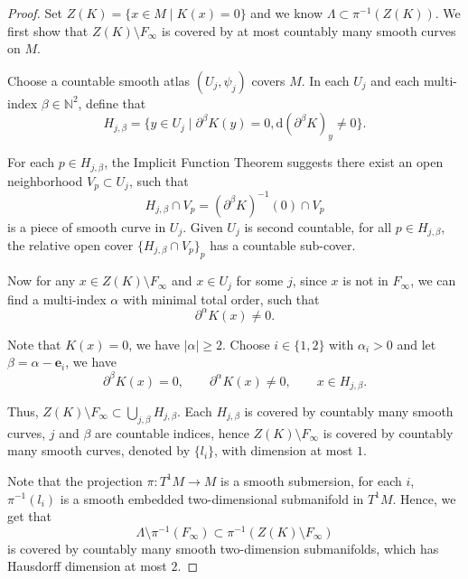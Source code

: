 \documentclass[reqno,11pt]{article}
\theoremstyle{definition}
\theoremstyle{remark}
\numberwithin{equation}{section}
\begin{document}
\begin{proof}
	Set $Z(K)=\{x\in M\mid K(x)=0\}$ and we know $\Lambda\subset\pi^{-1}(Z(K))$. We first show that $Z(K)\setminus F_{\infty}$ is covered by at most countably many smooth curves on $M$.

	Choose a countable smooth atlas $(U_{j},\psi_{j})$ covers $M$. In each $U_{j}$ and each multi-index $\beta\in\mathbb{N}^{2}$, define that
	\begin{displaymath}
		H_{j,\beta}=\{y\in U_{j}\mid \partial^{\beta}K(y)=0, {\mathrm{d}(\partial^{\beta}K)}_{y}\neq 0\}.
	\end{displaymath}

	For each $p\in H_{j,\beta}$, the Implicit Function Theorem suggests there exist an open neighborhood $V_{p}\subset U_{j}$, such that
	\begin{displaymath}
		H_{j,\beta}\cap V_{p}={(\partial^{\beta}K)}^{-1}(0)\cap V_{p}
	\end{displaymath}
	is a piece of smooth curve in $U_j$. Given $U_{j}$ is second countable, for all $p\in H_{j,\beta}$, the relative open cover ${\{H_{j,\beta}\cap V_{p}\}}_{p}$ has a countable sub-cover.

	Now for any $x\in Z(K)\setminus F_{\infty}$ and $x\in U_{j}$ for some $j$, since $x$ is not in $F_{\infty}$, we can find a multi-index $\alpha$ with minimal total order, such that
	\begin{displaymath}
		\partial^{\alpha} K(x)\neq 0.
	\end{displaymath}

	Note that $K(x)=0$, we have $|\alpha|\ge 2$. Choose $i\in\{1,2\}$ with $\alpha_{i}>0$ and let $\beta=\alpha-\bm{e}_{i}$, we have
	\begin{displaymath}
		\partial^{\beta} K(x)=0,\qquad \partial^{\alpha} K(x)\neq 0,\qquad x\in H_{j,\beta}.
	\end{displaymath}

	Thus, $Z(K)\setminus F_{\infty}\subset \bigcup_{j,\beta} H_{j,\beta}$. Each $H_{j,\beta}$ is covered by countably many smooth curves, $j$ and $\beta$ are countable indices, hence $Z(K)\setminus F_{\infty}$ is covered by countably many smooth curves, denoted by $\{l_{i}\}$, with dimension at most $1$.

	Note that the projection $\pi: T^{1}M\to M$ is a smooth submersion, for each $i$, $\pi^{-1}(l_{i})$ is a smooth embedded two-dimensional submanifold in $T^{1}M$. Hence, we get that
	\begin{displaymath}
		\Lambda\setminus\pi^{-1}(F_{\infty})\subset \pi^{-1}(Z(K)\setminus F_{\infty})
	\end{displaymath}
	is covered by countably many smooth two-dimension submanifolds, which has Hausdorff dimension at most $2$.


\end{proof}
\end{document}
